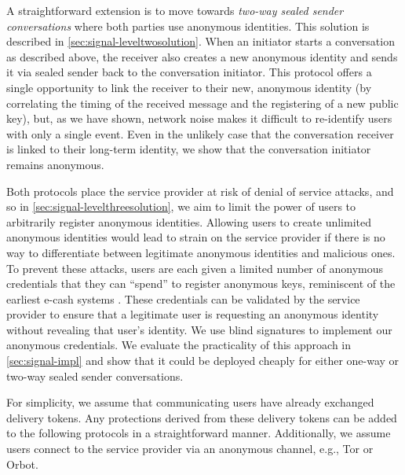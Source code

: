 A straightforward extension is to move towards {\em two-way sealed
sender conversations} where both parties use anonymous identities. This solution is described
in \cref{sec:signal-leveltwosolution}. When an initiator
starts a conversation as described above, the receiver
also creates a new anonymous identity and sends it via sealed sender back to the
conversation initiator. This protocol offers a single opportunity to
link the receiver to their new, anonymous identity (by correlating the
timing of the received message and the registering of a new public key),
but, as we have shown, network noise makes it difficult to re-identify
users with only a single event. Even in the unlikely case that
the conversation receiver is
linked to their long-term identity, we show that the conversation initiator
remains anonymous.

Both protocols place the service provider at risk of denial of service
attacks, and so in \cref{sec:signal-levelthreesolution}, we aim to
limit the power of users to arbitrarily register anonymous identities.
Allowing users to create unlimited anonymous identities would lead to
strain on the service provider if there is no way to differentiate
between legitimate anonymous identities and malicious ones. To prevent
these attacks, users are each given a limited number of anonymous
credentials that they can ``spend'' to register anonymous keys,
reminiscent of the earliest e-cash systems \cite{C:Chaum82}.  These
credentials can be validated by the service provider to ensure that a
legitimate user is requesting an anonymous identity without revealing
that user's identity. We use blind signatures to implement our anonymous
credentials.  We evaluate the practicality of this approach in
\cref{sec:signal-impl} and show that it could be deployed cheaply for
either one-way or two-way sealed sender conversations.


For simplicity, we assume that communicating users have already exchanged delivery tokens.  Any protections derived from these delivery tokens can be added to the following protocols in a straightforward manner.  Additionally, we assume users connect to the service provider via an anonymous channel, e.g., Tor or Orbot.


